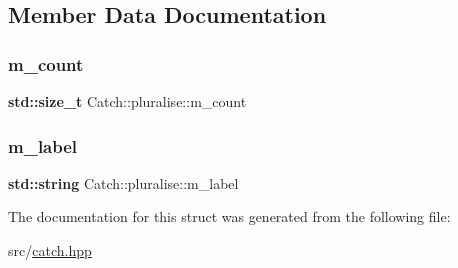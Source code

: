 \subsection{Member Data Documentation}
\mbox{\label{struct_catch_1_1pluralise_a4dce2fa13ec6f00fac09b2418265441e}} 
\subsubsection{\texorpdfstring{m\+\_\+count}{m\_count}}
{\footnotesize\ttfamily \textbf{ std\+::size\+\_\+t} Catch\+::pluralise\+::m\+\_\+count}

\mbox{\label{struct_catch_1_1pluralise_a8849cbdd3f11ebe7747597c8644e8793}} 
\subsubsection{\texorpdfstring{m\+\_\+label}{m\_label}}
{\footnotesize\ttfamily \textbf{ std\+::string} Catch\+::pluralise\+::m\+\_\+label}



The documentation for this struct was generated from the following file\+:\begin{DoxyCompactItemize}
\item 
src/\hyperlink{catch_8hpp}{catch.\+hpp}\end{DoxyCompactItemize}
